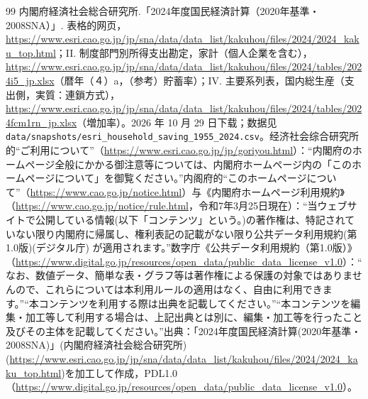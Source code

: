 \begin{thebibliography}{99}
 内閣府経済社会総合研究所.「2024年度国民経済計算（2020年基準・2008SNA）」. 表格的网页，\url{https://www.esri.cao.go.jp/jp/sna/data/data_list/kakuhou/files/2024/2024_kaku_top.html}；II. 制度部門別所得支出勘定，家計（個人企業を含む），\url{https://www.esri.cao.go.jp/jp/sna/data/data_list/kakuhou/files/2024/tables/2024i5_jp.xlsx}（暦年（４）a，（参考）貯蓄率）；IV. 主要系列表，国内総生産（支出側，実質：連鎖方式），\url{https://www.esri.cao.go.jp/jp/sna/data/data_list/kakuhou/files/2024/tables/2024fcm1rn_jp.xlsx}（増加率）。2026 年 10 月 29 日下载；数据见 \texttt{data/snapshots/esri\_household\_saving\_1955\_2024.csv}。经济社会综合研究所的“ご利用について”（\url{https://www.esri.cao.go.jp/jp/goriyou.html}）：“内閣府のホームページ全般にかかる御注意等については、内閣府ホームページ内の「このホームページについて」を御覧ください。”内阁府的“このホームページについて”（\url{https://www.cao.go.jp/notice.html}）与《内閣府ホームページ利用規約》（\url{https://www.cao.go.jp/notice/rule.html}，令和7年3月25日現在）：“当ウェブサイトで公開している情報(以下「コンテンツ」という。)の著作権は、特記されていない限り内閣府に帰属し、権利表記の記載がない限り公共データ利用規約(第1.0版)(デジタル庁) が適用されます。”数字庁《公共データ利用規約（第1.0版）》（\url{https://www.digital.go.jp/resources/open_data/public_data_license_v1.0}）：“なお、数値データ、簡単な表・グラフ等は著作権による保護の対象ではありませんので、これらについては本利用ルールの適用はなく、自由に利用できます。”“本コンテンツを利用する際は出典を記載してください。”“本コンテンツを編集・加工等して利用する場合は、上記出典とは別に、編集・加工等を行ったこと及びその主体を記載してください。”出典：「2024年度国民経済計算(2020年基準・2008SNA)」(内閣府経済社会総合研究所)(\url{https://www.esri.cao.go.jp/jp/sna/data/data_list/kakuhou/files/2024/2024_kaku_top.html})を加工して作成，PDL1.0（\url{https://www.digital.go.jp/resources/open_data/public_data_license_v1.0}）。


\end{thebibliography}
